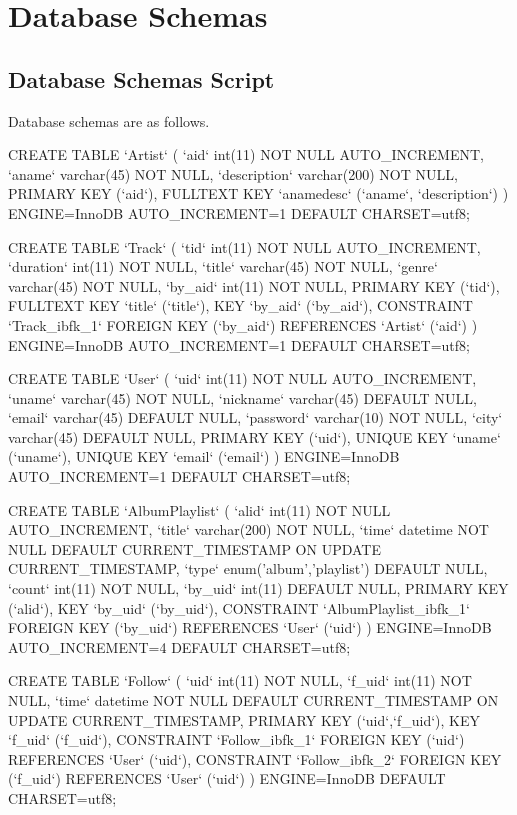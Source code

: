 \documentclass[letter, 12pt]{report}
\begin{document}
	\section{Database Schemas}
	\subsection{Database Schemas Script}
	Database schemas are as follows.
	\begin{spverbatim}
	CREATE TABLE `Artist` (
	`aid` int(11) NOT NULL AUTO_INCREMENT,
	`aname` varchar(45) NOT NULL,
	`description` varchar(200) NOT NULL,
	PRIMARY KEY (`aid`),
	FULLTEXT KEY `anamedesc` (`aname`, `description`)
	) ENGINE=InnoDB AUTO_INCREMENT=1 DEFAULT CHARSET=utf8;
	
	CREATE TABLE `Track` (
	`tid` int(11) NOT NULL AUTO_INCREMENT,
	`duration` int(11) NOT NULL,
	`title` varchar(45) NOT NULL,
	`genre` varchar(45) NOT NULL,
	`by_aid` int(11) NOT NULL,
	PRIMARY KEY (`tid`),
	FULLTEXT KEY `title` (`title`),
	KEY `by_aid` (`by_aid`),
	CONSTRAINT `Track_ibfk_1` FOREIGN KEY (`by_aid`) REFERENCES `Artist` (`aid`)
	) ENGINE=InnoDB AUTO_INCREMENT=1 DEFAULT CHARSET=utf8;
	
	CREATE TABLE `User` (
	`uid` int(11) NOT NULL AUTO_INCREMENT,
	`uname` varchar(45) NOT NULL,
	`nickname` varchar(45) DEFAULT NULL,
	`email` varchar(45) DEFAULT NULL,
	`password` varchar(10) NOT NULL,
	`city` varchar(45) DEFAULT NULL,
	PRIMARY KEY (`uid`),
	UNIQUE KEY `uname` (`uname`),
	UNIQUE KEY `email` (`email`)
	) ENGINE=InnoDB AUTO_INCREMENT=1 DEFAULT CHARSET=utf8;
	
	CREATE TABLE `AlbumPlaylist` (
	`alid` int(11) NOT NULL AUTO_INCREMENT,
	`title` varchar(200) NOT NULL,
	`time` datetime NOT NULL DEFAULT CURRENT_TIMESTAMP ON UPDATE CURRENT_TIMESTAMP,
	`type` enum('album','playlist') DEFAULT NULL,
	`count` int(11) NOT NULL,
	`by_uid` int(11) DEFAULT NULL,
	PRIMARY KEY (`alid`),
	KEY `by_uid` (`by_uid`),
	CONSTRAINT `AlbumPlaylist_ibfk_1` FOREIGN KEY (`by_uid`) REFERENCES `User` (`uid`)
	) ENGINE=InnoDB AUTO_INCREMENT=4 DEFAULT CHARSET=utf8;
	
	CREATE TABLE `Follow` (
	`uid` int(11) NOT NULL,
	`f_uid` int(11) NOT NULL,
	`time` datetime NOT NULL DEFAULT CURRENT_TIMESTAMP ON UPDATE CURRENT_TIMESTAMP,
	PRIMARY KEY (`uid`,`f_uid`),
	KEY `f_uid` (`f_uid`),
	CONSTRAINT `Follow_ibfk_1` FOREIGN KEY (`uid`) REFERENCES `User` (`uid`),
	CONSTRAINT `Follow_ibfk_2` FOREIGN KEY (`f_uid`) REFERENCES `User` (`uid`)
	) ENGINE=InnoDB DEFAULT CHARSET=utf8;
	

\end{spverbatim}
\end{document}
